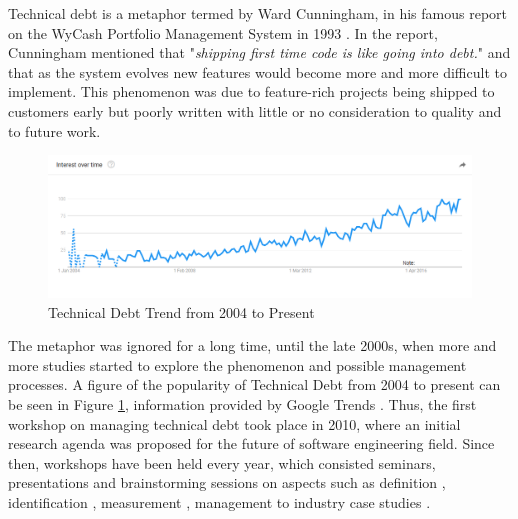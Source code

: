 \documentclass{mprop}
\begin{document}
Technical debt is a metaphor termed by Ward Cunningham, in his famous report on
the WyCash Portfolio Management System in 1993 \cite{Cunningham1993}. In the
report, Cunningham mentioned that "\textit{shipping first time code is like
	going into debt.}" and that as the system evolves new features would become more
and more difficult to implement. This phenomenon was due to feature-rich
projects being shipped to customers early but poorly written with little or no
consideration to quality and to future work.

\begin{figure}
	\centering
	\includegraphics[width=\linewidth]{visualisations/TD_trend.png}
	\caption{Technical Debt Trend from 2004 to Present}
	\label{fig:td-trend}
\end{figure}

The metaphor was ignored for a long time, until the late 2000s, when more and
more studies started to explore the phenomenon and possible management
processes. A figure of the popularity of Technical Debt from 2004 to present can
be seen in Figure \ref{fig:td-trend}, information provided by Google Trends
\cite{GoogleTrends}. Thus, the first workshop on managing technical debt took
place in 2010, where an initial research agenda was proposed for the future of
software engineering field. Since then, workshops have been held every year,
which consisted seminars, presentations and brainstorming sessions on aspects
such as definition \cite{Kruchten2012} \cite{Theodoropoulos2011}
\cite{Schmid2013}, identification \cite{Ernst2012}, measurement
\cite{Letouzey2012} \cite{Curtis2012} \cite{Nugroho2011} \cite{Zazworka2011}
\cite{Fontana2012} \cite{Bohnet2011}, management \cite{Guo2011}
\cite{Zazworka2011Prioritise} \cite{Seaman2012} to industry case studies
\cite{Lim2012} \cite{Morgenthaler2012} \cite{Codabux2013} \cite{Holvitie2014}
\cite{Klinger2011}.
\end{document}
